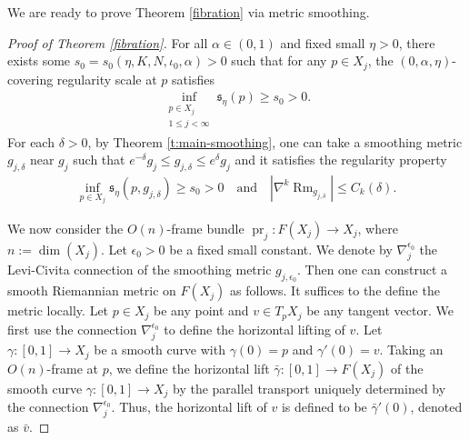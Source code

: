 \documentclass[11pt,reqno]{amsart}
\theoremstyle{definition}
\numberwithin{equation}{section}
\DeclareMathOperator{\pr}{pr}
\DeclareMathOperator{\Rm}{Rm}
\begin{document}
We are ready to prove Theorem \ref{fibration} via metric smoothing.
	




\begin{proof}[Proof of Theorem \ref{fibration}]
For all $\alpha \in (0,1)$ and fixed small $\eta>0$, there exists some $s_0 = s_0 (\eta, K, N, \iota_0, \alpha) > 0$ such that for any $p \in X_j$, the $(0,\alpha, \eta)$-covering regularity scale at $p$ satisfies 
\begin{align}
	\inf\limits_{\substack{p \in X_j\\1 \leq  j < \infty}}\mathfrak{s}_{\eta}(p) \geq s_0 > 0.\end{align}
   For each $\delta > 0$, by  Theorem \ref{t:main-smoothing}, 
    one can  	
take a smoothing metric $g_{j,\delta}$ near $g_j$ such that
$
e^{-\delta} g_j \leq g_{j,\delta} \leq e^{\delta} g_j	
$
and it satisfies the regularity property
\begin{align}
\inf\limits_{p \in X_j}\mathfrak{s}_{\eta}(p, g_{j, \delta}) \geq s_0 > 0 \quad \text{and} \quad |\nabla^k \Rm_{g_{j, \delta}}| \leq C_k(\delta).
\end{align}


  
We now consider the $O(n)$-frame bundle $\pr_j:F(X_j)\to X_j$, where $n := \dim(X_j)$. 
 Let  $\epsilon_0 > 0$ be a fixed small constant.
We denote by $\nabla_j^{\epsilon_0}$
the Levi-Civita connection of the smoothing metric $g_{j,\epsilon_0}$. Then one can construct a smooth Riemannian metric on $F(X_j)$
as follows. It suffices to the define the metric locally. Let $p \in X_j$
 be any point and $v\in T_p X_j$ be any tangent vector.  We first use the connection $\nabla_j^{\epsilon_0}$ to  define the horizontal lifting of $v$. 
Let $\gamma: [0,1] \to X_j$
be a smooth curve with $\gamma(0) = p$
and $\gamma'(0) = v$. 
Taking an $O(n)$-frame at $p$, we define the horizontal lift $\bar{\gamma}:[0,1]\to F(X_j)$ of the smooth curve $\gamma:[0,1]\to X_j$ by the parallel transport uniquely determined by the connection  $\nabla_j^{\epsilon_0}$.
Thus, the horizontal lift of $v$ is defined to be $\bar{\gamma}'(0)$, denoted as $\bar{v}$.


\end{proof}
\end{document}
